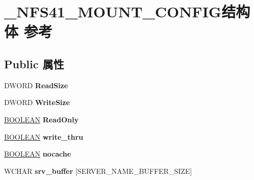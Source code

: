 \hypertarget{struct___n_f_s41___m_o_u_n_t___c_o_n_f_i_g}{}\section{\+\_\+\+N\+F\+S41\+\_\+\+M\+O\+U\+N\+T\+\_\+\+C\+O\+N\+F\+I\+G结构体 参考}
\label{struct___n_f_s41___m_o_u_n_t___c_o_n_f_i_g}
\subsection*{Public 属性}
\begin{DoxyCompactItemize}
\item 
\mbox{\label{struct___n_f_s41___m_o_u_n_t___c_o_n_f_i_g_aa383684c7b68209293982135605dec92}} 
D\+W\+O\+RD {\bfseries Read\+Size}
\item 
\mbox{\label{struct___n_f_s41___m_o_u_n_t___c_o_n_f_i_g_a8f2a2e2f0d7caa65d01a8397a26f59d7}} 
D\+W\+O\+RD {\bfseries Write\+Size}
\item 
\mbox{\label{struct___n_f_s41___m_o_u_n_t___c_o_n_f_i_g_ac89e5f606ee71c783535d195817263cd}} 
\hyperlink{_processor_bind_8h_a112e3146cb38b6ee95e64d85842e380a}{B\+O\+O\+L\+E\+AN} {\bfseries Read\+Only}
\item 
\mbox{\label{struct___n_f_s41___m_o_u_n_t___c_o_n_f_i_g_a21f98194f66578a038d1f114242eefa0}} 
\hyperlink{_processor_bind_8h_a112e3146cb38b6ee95e64d85842e380a}{B\+O\+O\+L\+E\+AN} {\bfseries write\+\_\+thru}
\item 
\mbox{\label{struct___n_f_s41___m_o_u_n_t___c_o_n_f_i_g_a44a785fa86463a826582a0df4ad26371}} 
\hyperlink{_processor_bind_8h_a112e3146cb38b6ee95e64d85842e380a}{B\+O\+O\+L\+E\+AN} {\bfseries nocache}
\item 
\mbox{\label{struct___n_f_s41___m_o_u_n_t___c_o_n_f_i_g_a430b520b568c9cd7901937826e0b0cae}} 
W\+C\+H\+AR {\bfseries srv\+\_\+buffer} \mbox{[}S\+E\+R\+V\+E\+R\+\_\+\+N\+A\+M\+E\+\_\+\+B\+U\+F\+F\+E\+R\+\_\+\+S\+I\+ZE\mbox{]}

\end{DoxyCompactItemize}
